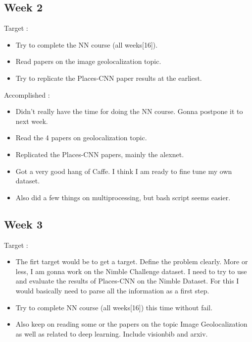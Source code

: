 \documentclass{article}
\begin{document}
\subsection{Week 2}
Target :
\begin{itemize}
\item Try to complete the NN course (all weeks[16]).
\item Read papers on the image geolocalization topic.
\item Try to replicate the Places-CNN paper results at the earliest.
\end{itemize}

Accomplished :
\begin{itemize}
\item Didn't really have the time for doing the NN course. Gonna postpone it to next week.
\item Read the 4 papers on geolocalization topic.
\item Replicated the Places-CNN papers, mainly the alexnet.
\item Got a very good hang of Caffe. I think I am ready to fine tune my own dataset.
\item Also did a few things on multiprocessing, but bash script seems easier.
\end{itemize}

\subsection{Week 3}
Target :
\begin{itemize}
\item The firt target would be to get a target. Define the problem clearly. More or less, I am gonna work on the Nimble Challenge dataset. I need to try to use and evaluate the results of Places-CNN on the Nimble Dataset. For this I would basically need to parse all the information as a first step.
\item Try to complete NN course (all weeks[16]) this time without fail.
\item Also keep on reading some or the papers on the topic Image Geolocalization as well as related to deep learning. Include visionbib and arxiv.
\end{itemize}
\end{document}
